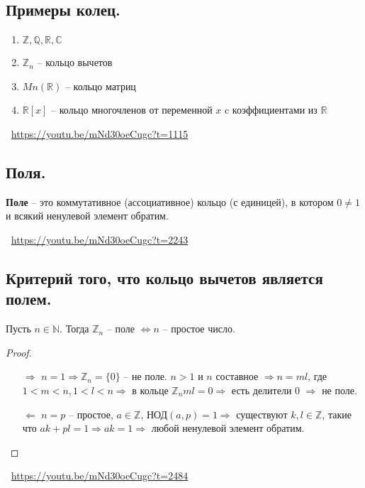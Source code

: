 \subsection{Примеры колец.}
\begin{enumerate}
    \item $\mathbb{Z}, \mathbb{Q}, \mathbb{R}, \mathbb{C}$
    \item $\mathbb{Z}_n$ -- кольцо вычетов
    \item $Mn(\mathbb{R})$ -- кольцо матриц
    \item $\mathbb{R}[x]$ -- кольцо многочленов от переменной $x$ c коэффициентами из $\mathbb{R}$
\end{enumerate}
\large \faYoutube \normalsize $\>$ \url{https://youtu.be/mNd30oeCugc?t=1115}

\subsection{Поля.}
\begin{definition}
    \textbf{Поле} -- это коммутативное (ассоциативное) кольцо (с единицей), в котором $0 \neq 1$ и всякий ненулевой элемент обратим.
\end{definition}
\large \faYoutube \normalsize $\>$ \url{https://youtu.be/mNd30oeCugc?t=2243}

\subsection{Критерий того, что кольцо вычетов является полем.}
\begin{statement}
    Пусть $n \in \mathbb{N}$. Тогда $\mathbb{Z}_n$ -- поле $\Leftrightarrow n$ -- простое число.
    \begin{proof}
        \begin{enumerate}
            \item[$\Rightarrow$] $n = 1 \Rightarrow \mathbb{Z}_n = \{0\}$ -- не поле. \newline $n > 1$ и $n$ составное $\Rightarrow n = ml$, где $1 < m < n, 1 < l < n \Rightarrow$ в кольце $\mathbb{Z}_n ml = 0 \Rightarrow$ есть делители 0 $\Rightarrow$ не поле.
            \item[$\Leftarrow$] $n = p$ -- простое, $a \in \mathbb{Z}$, НОД$(a,p) = 1 \Rightarrow$ существуют $k,l \in \mathbb{Z}$, такие что $ak + pl = 1 \Rightarrow ak = 1 \Rightarrow $ любой ненулевой элемент обратим.
        \end{enumerate}
    \end{proof}
\end{statement}
\large \faYoutube \normalsize $\>$ \url{https://youtu.be/mNd30oeCugc?t=2484}